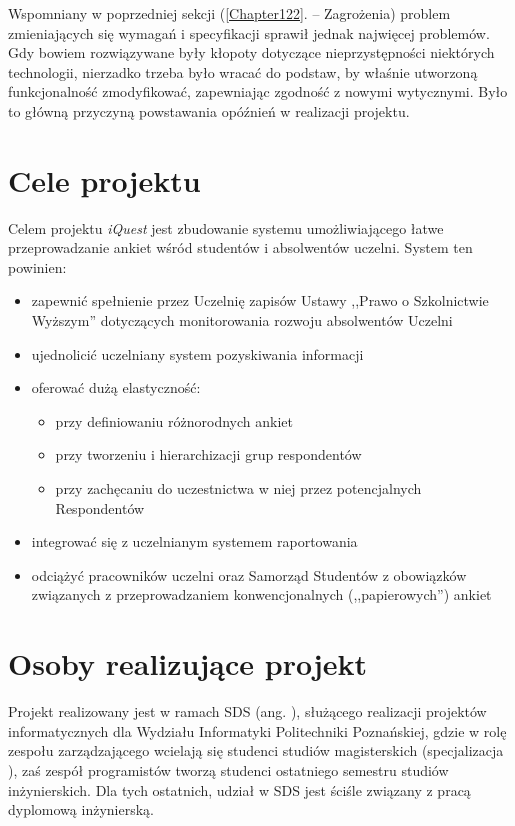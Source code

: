 Wspomniany w poprzedniej sekcji (\ref{Chapter122}. -- Zagrożenia) problem zmieniających się wymagań i specyfikacji sprawił jednak najwięcej problemów. Gdy bowiem rozwiązywane były kłopoty dotyczące nieprzystępności niektórych technologii, nierzadko trzeba było wracać do podstaw, by właśnie utworzoną funkcjonalność zmodyfikować, zapewniając zgodność z nowymi wytycznymi. Było to główną przyczyną powstawania opóźnień w realizacji projektu.

\section{Cele projektu}
\label{Chapter13}

Celem projektu \textit{iQuest} jest zbudowanie systemu umożliwiającego łatwe przeprowadzanie ankiet wśród studentów i absolwentów uczelni. System ten powinien:
\begin{itemize}
\item{zapewnić spełnienie przez Uczelnię zapisów Ustawy ,,Prawo o Szkolnictwie Wyższym'' dotyczących monitorowania rozwoju absolwentów Uczelni\cite{AP:PoSW05}}
\item{ujednolicić uczelniany system pozyskiwania informacji}
\item{oferować dużą elastyczność:
\begin{itemize}
\item{przy definiowaniu różnorodnych ankiet}
\item{przy tworzeniu i hierarchizacji grup respondentów}
\item{przy zachęcaniu do uczestnictwa w niej przez potencjalnych Respondentów}
\end{itemize}}
\item{integrować się z uczelnianym systemem raportowania}
\item{odciążyć pracowników uczelni oraz Samorząd Studentów z obowiązków związanych z przeprowadzaniem konwencjonalnych (,,papierowych'') ankiet}
\end{itemize}

\section{Osoby realizujące projekt}
\label{Chapter14}

Projekt realizowany jest w ramach SDS (ang. ), służącego realizacji projektów informatycznych dla Wydziału Informatyki Politechniki Poznańskiej, gdzie w rolę zespołu zarządzającego wcielają się studenci studiów magisterskich (specjalizacja ), zaś zespół programistów tworzą studenci ostatniego semestru studiów inżynierskich. Dla tych ostatnich, udział w SDS jest ściśle związany z pracą dyplomową inżynierską. \\

